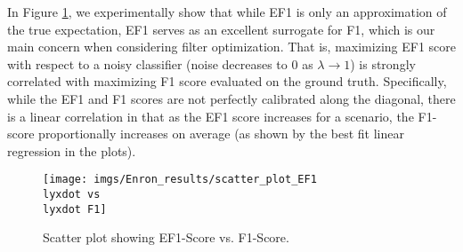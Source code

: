 







In Figure \ref{fig:F1_vs_EF1}, we experimentally show that while EF1 is only an approximation of the true expectation, EF1 serves as an excellent surrogate for F1, which is our main concern when considering filter optimization.  That is, maximizing EF1 score with respect to a noisy classifier (noise decreases to 0 as $\lambda \to 1$) is strongly correlated with maximizing F1 score evaluated on the ground truth.   Specifically, while the EF1 and F1 scores are not perfectly calibrated along the diagonal, there is a linear correlation in that as the EF1 score increases for a scenario, the F1-score proportionally increases on average (as shown by the best fit linear regression in the plots).



\begin{figure}[H]
\begin{centering}
\par\end{centering}
\begin{centering}
\texttt{[image: imgs/Enron\_results/scatter\_plot\_EF1\\lyxdot vs\\lyxdot F1]}
\par\end{centering}
\caption{Scatter plot showing EF1-Score vs. F1-Score.}
\label{fig:F1_vs_EF1}
\end{figure}





